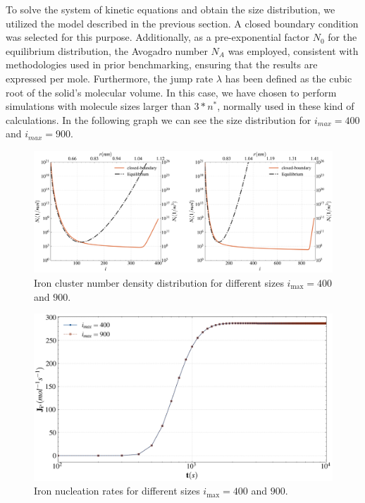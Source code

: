 To solve the system of kinetic equations and obtain the size distribution, we utilized the model described in the previous section. 
A closed boundary condition was selected for this purpose. Additionally, as a pre-exponential factor $N_0$ for the equilibrium distribution, 
the Avogadro number $N_A$ was employed, consistent with methodologies used in prior benchmarking, ensuring that the results are expressed per mole. 
Furthermore, the jump rate $\lambda$ has been defined as the cubic root of the solid's molecular volume.
In this case, we have chosen to perform simulations with molecule sizes larger than $3*n^*$, normally used in these kind of calculations. In the 
following graph we can see the size distribution for $i_{max}=400$ and $i_{max}=900$.

\begin{figure}[H]
    \centering
    \includegraphics[width=1.1\linewidth]{psd_iron.png}
    \caption{Iron cluster number density distribution for different sizes $i_{\text{max}} = 400$ and $900$.}
    \label{fig:psd_iron}
\end{figure}

\begin{figure}[H]
    \centering
    \includegraphics[width=1.1\linewidth]{postcritical_nucleation_rate_fe.png}
    \caption{Iron nucleation rates for different sizes $i_{\text{max}} = 400$ and $900$.}
    \label{fig:postcritical_nucleation_rate_fe}
\end{figure}

